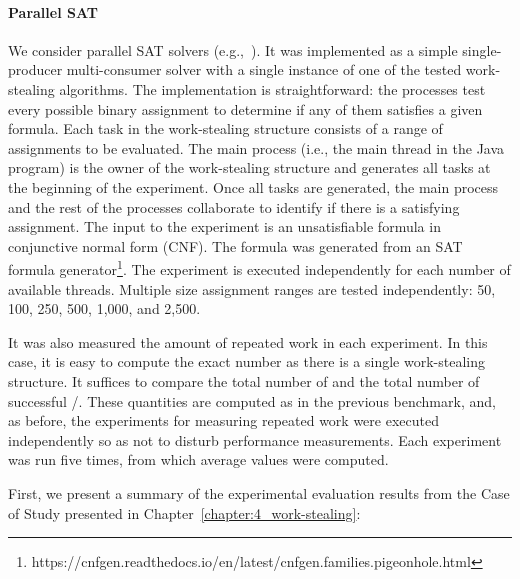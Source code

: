 \paragraph*{Parallel SAT}
We consider parallel SAT solvers (e.g.,~\cite{DBLP_journals_amai_BohmS96, DBLP_journals_entcs_FeldmanDH05, DBLP_books_sp_HS2018}). It was implemented as a simple single-producer multi-consumer solver with a single instance of one of the tested work-stealing algorithms. The implementation is straightforward: the processes test every possible binary assignment to determine if any of them satisfies a given formula. Each task in the work-stealing structure consists of a range of assignments to be evaluated.  The main process (i.e., the main thread in the Java program) is the owner of the work-stealing structure and generates all tasks at the beginning of the experiment. Once all tasks are generated, the main process and the rest of the processes collaborate to identify if there is a satisfying assignment.  The input to the experiment is an unsatisfiable formula in conjunctive normal form (CNF). The formula was generated from an SAT formula generator\footnote{https://cnfgen.readthedocs.io/en/latest/cnfgen.families.pigeonhole.html}.  The experiment is executed independently for each number of available threads.  Multiple size assignment ranges are tested independently: 50, 100, 250, 500, 1,000, and 2,500.

It was also measured the amount of repeated work in each experiment.  In this case, it is easy to compute the exact number as there is a single work-stealing structure. It suffices to compare the total number of \Puts and the total number of successful \Takes/\Steals. These quantities are computed as in the previous benchmark, and, as before, the experiments for measuring repeated work were executed independently so as not to disturb performance measurements. Each experiment was run five times, from which average values were computed.


First, we present a summary of the experimental evaluation results from the Case of Study presented in Chapter~\ref{chapter:4_work-stealing}:

